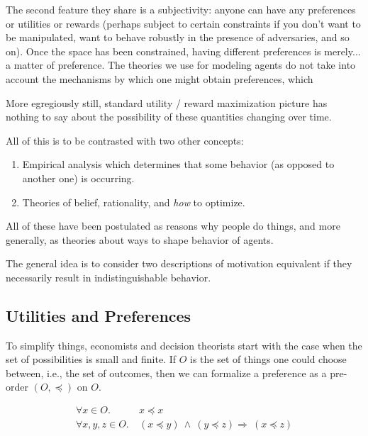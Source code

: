 \documentclass{book}
\begin{document}
	The second feature they share is a subjectivity: anyone can have any preferences or utilities or rewards (perhaps subject to certain constraints if you don't want to be manipulated, want to behave robustly in the presence of adversaries, and so on). Once the space has been constrained, having different preferences is merely... a matter of preference. The theories we use for modeling agents do not take into account the mechanisms by which one might obtain preferences, which 
	
	More egregiously still, standard utility / reward maximization picture has nothing to say about the possibility of these quantities changing over time.
	
	
	
	All of this is to be contrasted with two other concepts:

	\begin{enumerate}
		\item Empirical analysis which determines that some behavior (as opposed to another one) is occurring. 
		\item Theories of belief, rationality, and \emph{how} to optimize.
	\end{enumerate}
	
	
	
	All of these have been postulated as reasons why people do things, and more generally, as theories about ways to shape behavior of agents. 
	
	
	
	The general idea is to consider two descriptions of motivation equivalent if they necessarily result in indistinguishable behavior. 
	
	
	\subsection{Utilities and Preferences}
	
	To simplify things, economists and decision theorists start with the case when the set of possibilities is small and finite. If $O$ is the set of things one could choose between, i.e., the set of outcomes, then we can formalize a preference as a pre-order $(O, \preccurlyeq)$ on $O$.
	
	\begin{align*}
		\forall x \in O.&~x \preccurlyeq x \tag{Reflexivity}\\
		\forall x,y,z \in O.&~(x\preccurlyeq y)~\land~( y \preccurlyeq z) \Rightarrow~(x \preccurlyeq z) \tag{Transitivity}
	\end{align*}
	
\end{document}

